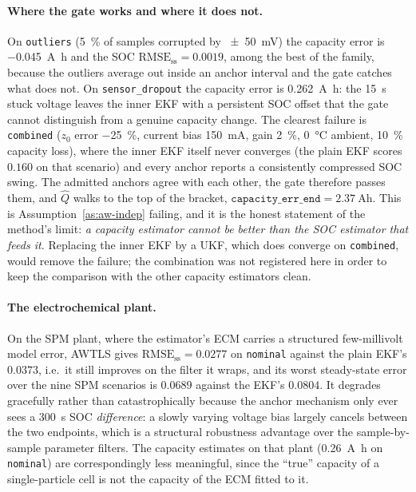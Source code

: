 \paragraph{Where the gate works and where it does not.}  On \texttt{outliers}
(\SI{5}{\percent} of samples corrupted by \SI{\pm50}{\milli\volt}) the capacity error is
\SI{-0.045}{\ampere\hour} and the SOC $\text{RMSE}_\text{ss}=0.0019$, among the best of the family,
because the outliers average out inside an anchor interval and the gate catches what does not.  On
\texttt{sensor\_dropout} the capacity error is \SI{+0.262}{\ampere\hour}: the \SI{15}{\second} stuck
voltage leaves the inner EKF with a persistent SOC offset that the gate cannot distinguish from a
genuine capacity change.  The clearest failure is \texttt{combined} ($z_0$ error \SI{-25}{\percent},
current bias \SI{150}{\milli\ampere}, gain \SI{+2}{\percent}, \SI{0}{\celsius} ambient,
\SI{10}{\percent} capacity loss), where the inner EKF itself never converges (the plain EKF scores
$0.160$ on that scenario) and every anchor reports a consistently compressed SOC swing.  The admitted
anchors agree with each other, the gate therefore passes them, and $\hat Q$ walks to the top of the
bracket, $\texttt{capacity\_err\_end}=\SI{+2.37}{\ampere\hour}$.  This is
Assumption~\ref{as:aw-indep} failing, and it is the honest statement of the method's limit: \emph{a
capacity estimator cannot be better than the SOC estimator that feeds it.}  Replacing the inner EKF
by a UKF, which does converge on \texttt{combined}, would remove the failure; the combination was not
registered here in order to keep the comparison with the other capacity estimators clean.

\paragraph{The electrochemical plant.}  On the SPM plant, where the estimator's ECM carries a
structured few-millivolt model error, AWTLS gives $\text{RMSE}_\text{ss}=0.0277$ on \texttt{nominal}
against the plain EKF's $0.0373$, i.e.\ it still improves on the filter it wraps, and its worst
steady-state error over the nine SPM scenarios is $0.0689$ against the EKF's $0.0804$.  It degrades
gracefully rather than catastrophically because the anchor mechanism only ever sees a
\SI{300}{\second} SOC \emph{difference}: a slowly varying voltage bias largely cancels between the
two endpoints, which is a structural robustness advantage over the sample-by-sample parameter
filters.  The capacity estimates on that plant (\SI{+0.26}{\ampere\hour} on \texttt{nominal}) are
correspondingly less meaningful, since the ``true'' capacity of a single-particle cell is not the
capacity of the ECM fitted to it.

